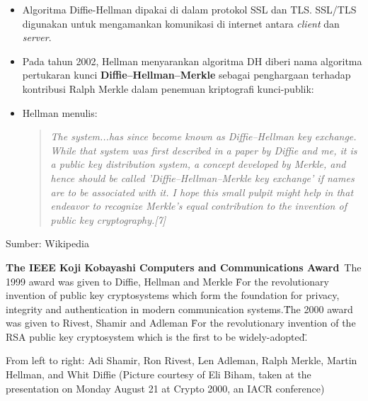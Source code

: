 \documentclass{article}
\begin{document}
\newpage


\begin{itemize}
    \item Algoritma Diffie-Hellman dipakai di dalam protokol SSL dan TLS. SSL/TLS digunakan untuk mengamankan komunikasi di internet antara \textit{client} dan \textit{server}.
    \item Pada tahun 2002, Hellman menyarankan algoritma DH diberi nama algoritma pertukaran kunci \textbf{Diffie--Hellman--Merkle} sebagai penghargaan terhadap kontribusi Ralph Merkle dalam penemuan kriptografi kunci-publik:
    \item Hellman menulis:
    \begin{quote}
    \textit{The system...has since become known as Diffie--Hellman key exchange. While that system was first described in a paper by Diffie and me, it is a public key distribution system, a concept developed by Merkle, and hence should be called 'Diffie--Hellman--Merkle key exchange' if names are to be associated with it. I hope this small pulpit might help in that endeavor to recognize Merkle's equal contribution to the invention of public key cryptography.[7]}
    \end{quote}
\end{itemize}

\begin{flushright}
Sumber: Wikipedia
\end{flushright}

\newpage


\textbf{The IEEE Koji Kobayashi Computers and Communications Award}\
The 1999 award was given to Diffie, Hellman and Merkle \"For the revolutionary invention of public key cryptosystems which form the foundation for privacy, integrity and authentication in modern communication systems.\"
The 2000 award was given to Rivest, Shamir and Adleman \"For the revolutionary invention of the RSA public key cryptosystem which is the first to be widely-adopted.\"

\vspace{50mm}

From left to right: Adi Shamir, Ron Rivest, Len Adleman, Ralph Merkle, Martin Hellman, and Whit Diffie (Picture courtesy of Eli Biham, taken at the presentation on Monday August 21 at Crypto 2000, an IACR conference)

\
\centering{\textcolor{red}{Sumber: http://www.merkle.com/merkleDir/KobayashiAward.html}}
\end{document}
